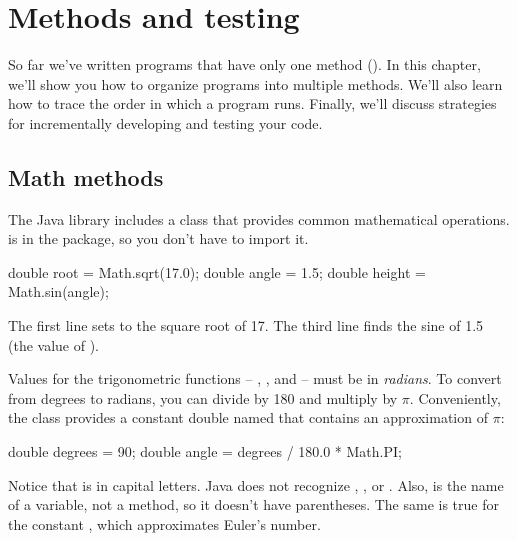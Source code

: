 \chapter{Methods and testing}

So far we've written programs that have only one method ().
In this chapter, we'll show you how to organize programs into multiple methods.
We'll also learn how to trace the order in which a program runs.
Finally, we'll discuss strategies for incrementally developing and testing your code.



\section{Math methods}



The Java library includes a  class that provides common mathematical operations.
 is in the  package, so you don't have to import it.

\begin{code}
double root = Math.sqrt(17.0);
double angle = 1.5;
double height = Math.sin(angle);
\end{code}

The first line sets  to the square root of 17.
The third line finds the sine of 1.5 (the value of ).


Values for the trigonometric functions -- , , and  -- must be in {\em radians}.
To convert from degrees to radians, you can divide by 180 and multiply by $\pi$.
Conveniently, the  class provides a constant double named  that contains an approximation of $\pi$:

\begin{code}
double degrees = 90;
double angle = degrees / 180.0 * Math.PI;
\end{code}

Notice that  is in capital letters.
Java does not recognize , , or .
Also,  is the name of a variable, not a method, so it doesn't have parentheses.
The same is true for the constant , which approximates Euler's number.

